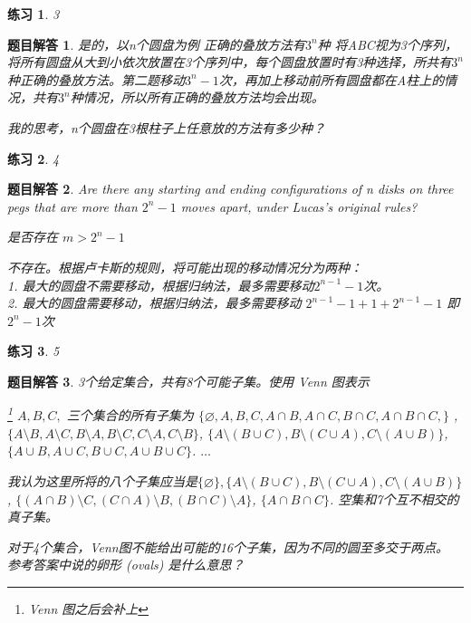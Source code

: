 \documentclass[mode=geye]{elegantnote}
\newtheorem{exercise}{练习}
\newtheorem{answer}{题目解答}
\begin{document}
\begin{exercise}3
\end{exercise}

\begin{answer}
	是的，以n个圆盘为例
	正确的叠放方法有$ 3^n $种 将ABC视为3个序列，将所有圆盘从大到小依次放置在3个序列中，每个圆盘放置时有3种选择，所共有$ 3^n $种正确的叠放方法。第二题移动$ 3^n-1 $次，再加上移动前所有圆盘都在A柱上的情况，共有$ 3^n $种情况，所以所有正确的叠放方法均会出现。
	
	我的思考，n个圆盘在3根柱子上任意放的方法有多少种？
\end{answer}

\begin{exercise}4
\end{exercise}

\begin{answer}
	Are there any starting and ending configurations of n disks on three pegs
	that are more than $ 2^n − 1 $ moves apart, under Lucas's original rules?
	
	是否存在 $ m > 2^n-1 $
	
	不存在。根据卢卡斯的规则，将可能出现的移动情况分为两种：\\		
	1. 最大的圆盘不需要移动，根据归纳法，最多需要移动$ 2^{n-1}-1 $次。\\	
	2. 最大的圆盘需要移动，根据归纳法，最多需要移动 $ 2^{n-1}-1 + 1 + 2^{n-1}-1 $ 即 $  2^{n}-1  $次
\end{answer}

\begin{exercise}5
\end{exercise}

\begin{answer}
	3个给定集合，共有8个可能子集。使用 Venn 图表示
	
	\footnote{Venn 图之后会补上}
	$ A, B, C, $ 三个集合的所有子集为 $ \{\varnothing, A, B, C, A\cap B, A\cap C, B\cap C, A \cap B \cap C, \} $ , $\{A\setminus B, A\setminus C, B\setminus A, B\setminus C, C\setminus A, C\setminus B \}$, $ \{A\setminus (B\cup C), B\setminus (C\cup A), C\setminus (A\cup B)\} $, $ \{A\cup B, A\cup C, B\cup C, A\cup B\cup C\} $. $ \dots $
	
	我认为这里所将的八个子集应当是$ \{\varnothing\}, \{A\setminus (B\cup C), B\setminus (C\cup A), C\setminus (A\cup B)\} $, $ \{(A\cap B)\setminus C, (C\cap A)\setminus B, (B\cap C)\setminus A \} $, $ \{A\cap B\cap C\} $. 空集和7个互不相交的真子集。
	
	对于4个集合，Venn图不能给出可能的16个子集，因为不同的圆至多交于两点。 参考答案中说的卵形 (ovals) 是什么意思？
\end{answer}
\end{document}
